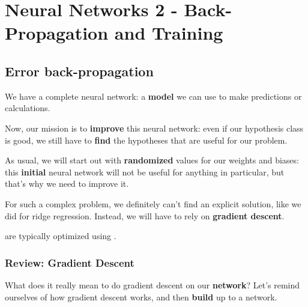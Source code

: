 \setcounter{chapter}{7-1}

\chapter{Neural Networks 2 - Back-Propagation and Training}


\setcounter{section}{4}
\section{Error back-propagation }

    We have a complete neural network: a \textbf{model} we can use to make predictions or calculations.
    
    Now, our mission is to \textbf{improve} this neural network: even if our hypothesis class is good, we still have to \textbf{find} the hypotheses that are useful for our problem.
    
    As usual, we will start out with \textbf{randomized} values for our weights and biases: this \textbf{initial} neural network will not be useful for anything in particular, but that's why we need to improve it.
    
    For such a complex problem, we definitely can't find an explicit solution, like we did for ridge regression. Instead, we will have to rely on \textbf{gradient descent}.\\
    
    \begin{concept}
         are typically optimized using .
    \end{concept}
    
    \phantom{}
    
    \subsection{Review: Gradient Descent}
    
        What does it really mean to do gradient descent on our \textbf{network}? Let's remind ourselves of how gradient descent works, and then \textbf{build} up to a network.
        
